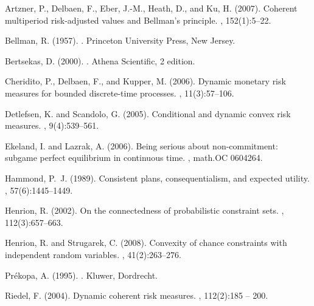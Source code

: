 \documentclass[a4paper]{amsart}
\theoremstyle{plain}
\theoremstyle{definition}
\theoremstyle{remark}
\begin{document}
\begin{thebibliography}{}

Artzner, P., Delbaen, F., Eber, J.-M., Heath, D., and Ku, H.
(2007).
\newblock Coherent multiperiod risk-adjusted values and {B}ellman's principle.
, 152(1):5--22.

Bellman, R. (1957).
.
\newblock Princeton University Press, New Jersey.

Bertsekas, D. (2000).
.
\newblock Athena Scientific, 2 edition.

Cheridito, P., Delbaen, F., and Kupper, M. (2006).
\newblock Dynamic monetary risk measures for bounded discrete-time processes.
, 11(3):57--106.

Detlefsen, K. and Scandolo, G. (2005).
\newblock Conditional and dynamic convex risk measures.
, 9(4):539--561.

Ekeland, I. and Lazrak, A. (2006).
\newblock Being serious about non-commitment: subgame perfect equilibrium in
  continuous time.
, math.OC 0604264.

Hammond, P.~J. (1989).
\newblock Consistent plans, consequentialism, and expected utility.
, 57(6):1445--1449.

Henrion, R. (2002).
\newblock On the connectedness of probabilistic constraint sets.
,
  112(3):657--663.

Henrion, R. and Strugarek, C. (2008).
\newblock Convexity of chance constraints with independent random variables.
, 41(2):263--276.

Pr\'{e}kopa, A. (1995).
.
\newblock Kluwer, Dordrecht.

Riedel, F. (2004).
\newblock Dynamic coherent risk measures.
, 112(2):185 -- 200.


\end{thebibliography}
\end{document}
